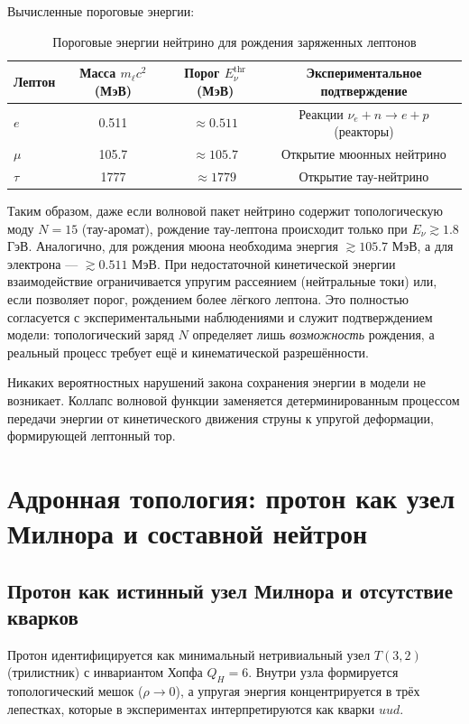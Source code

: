 \documentclass[11pt,a4paper]{article}
\begin{document}
	Вычисленные пороговые энергии:
	
	\begin{table}[htbp]
		\centering
		\caption{Пороговые энергии нейтрино для рождения заряженных лептонов}
		\begin{tabular}{lccc}
			\toprule
			Лептон & Масса $m_\ell c^2$ (МэВ) & Порог $E_{\nu}^{\text{thr}}$ (МэВ) & Экспериментальное подтверждение \\
			\midrule
			$e$  & 0.511 & $\approx 0.511$ & Реакции $\nu_e + n \to e + p$ (реакторы) \\
			$\mu$ & 105.7 & $\approx 105.7$ & Открытие мюонных нейтрино \cite{Lederman1962} \\
			$\tau$ & 1777   & $\approx 1779$   & Открытие тау-нейтрино \cite{DONUT2000} \\
			\bottomrule
		\end{tabular}
		\label{tab:thresholds}
	\end{table}
	
	Таким образом, даже если волновой пакет нейтрино содержит топологическую моду $N=15$ (тау-аромат), рождение тау-лептона происходит только при $E_{\nu} \gtrsim 1.8$ ГэВ. Аналогично, для рождения мюона необходима энергия $\gtrsim 105.7$ МэВ, а для электрона — $\gtrsim 0.511$ МэВ. При недостаточной кинетической энергии взаимодействие ограничивается упругим рассеянием (нейтральные токи) или, если позволяет порог, рождением более лёгкого лептона. Это полностью согласуется с экспериментальными наблюдениями и служит подтверждением модели: топологический заряд $N$ определяет лишь \textit{возможность} рождения, а реальный процесс требует ещё и кинематической разрешённости.
	
	Никаких вероятностных нарушений закона сохранения энергии в модели не возникает. Коллапс волновой функции заменяется детерминированным процессом передачи энергии от кинетического движения струны к упругой деформации, формирующей лептонный тор.
	
	\section{Адронная топология: протон как узел Милнора и составной нейтрон}
	
	\subsection{Протон как истинный узел Милнора и отсутствие кварков}
	Протон идентифицируется как минимальный нетривиальный узел $T(3,2)$ (трилистник) с инвариантом Хопфа $Q_H=6$. Внутри узла формируется топологический мешок ($\rho\to0$), а упругая энергия концентрируется в трёх лепестках, которые в экспериментах интерпретируются как кварки $uud$.
	
\end{document}
